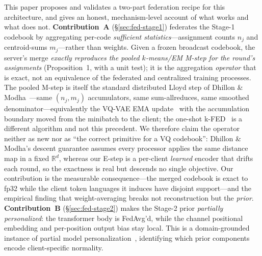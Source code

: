 \documentclass[11pt]{article}
\theoremstyle{plain}
\theoremstyle{definition}
\begin{document}
This paper proposes and validates a two-part federation recipe for this
architecture, and gives an honest, mechanism-level account of what works and what
does not. \textbf{Contribution~A} (\S\ref{sec:fed-stage1}) federates the Stage-1
codebook by aggregating per-code \emph{sufficient statistics}---assignment counts
$n_j$ and centroid-sums $m_j$---rather than weights. Given a frozen broadcast
codebook, the server's merge \emph{exactly reproduces the pooled $k$-means/EM
M-step for the round's assignments} (Proposition~1, with a unit test); it is the
aggregation \emph{operator} that is exact, not an equivalence of the federated and
centralized training processes. The pooled M-step is itself the standard distributed
Lloyd step of Dhillon \& Modha~\cite{dhillon1999parallel}---same $(n_j,m_j)$ accumulators,
same sum-allreduces, same smoothed denominator---equivalently the VQ-VAE EMA
update~\cite[App.~A.1]{van_den_oord2017neural} with the accumulation boundary moved from
the minibatch to the client; the one-shot k-FED~\cite{dennis2021kfed} is a different
algorithm and not this precedent. We therefore claim the operator neither as new nor as
``the correct primitive for a VQ codebook'': Dhillon \& Modha's descent guarantee assumes
every processor applies the same distance map in a fixed $\mathbb{R}^d$, whereas our E-step
is a per-client \emph{learned} encoder that drifts each round, so the exactness is real but
descends no single objective. Our contribution is the measurable consequence---the merged
codebook is exact to fp32 while the client token languages it induces have disjoint
support---and the empirical finding that weight-averaging breaks not reconstruction but the
\emph{prior}. \textbf{Contribution~B} (\S\ref{sec:fed-stage2}) makes the Stage-2
prior \emph{partially personalized}: the transformer body is FedAvg'd, while the
channel positional embedding and per-position output bias stay local. This is a
domain-grounded instance of partial model
personalization~\cite{arivazhagan2019fedper,collins2021fedrep,pillutla2022partial,li2021fedbn},
identifying which prior components encode client-specific normality.
\end{document}
